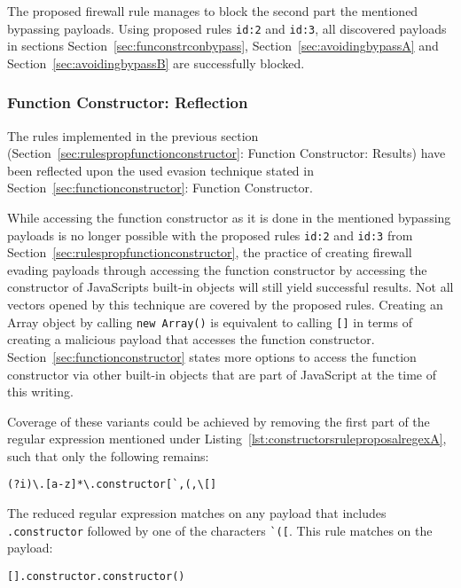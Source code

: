 The proposed firewall rule manages to block the second part the mentioned bypassing payloads. Using proposed rules \verb|id:2| and \verb|id:3|, all discovered payloads in sections Section~\ref{sec:funconstrconbypass}, Section~\ref{sec:avoidingbypassA} and Section~\ref{sec:avoidingbypassB} are successfully blocked.



\subsubsection{Function Constructor: Reflection}
\label{sec:rulespropfunctionconstructorreflection}
The rules implemented in the previous section (Section~\ref{sec:rulespropfunctionconstructor}: Function Constructor: Results) have been reflected upon the used evasion technique stated in Section~\ref{sec:functionconstructor}: Function Constructor.

While accessing the function constructor as it is done in the mentioned bypassing payloads is no longer possible with the proposed rules \verb|id:2| and \verb|id:3| from Section~\ref{sec:rulespropfunctionconstructor}, the practice of creating firewall evading payloads through accessing the function constructor by accessing the constructor of JavaScripts built-in objects will still yield successful results. Not all vectors opened by this technique are covered by the proposed rules. Creating an Array object by calling \verb|new Array()| is equivalent to calling \verb|[]| in terms of creating a malicious payload that accesses the function constructor. Section~\ref{sec:functionconstructor} states more options to access the function constructor via other built-in objects that are part of JavaScript at the time of this writing.

Coverage of these variants could be achieved by removing the first part of the regular expression mentioned under Listing~\ref{lst:constructorsruleproposalregexA}, such that only the following remains:

\begin{lstlisting}[style=basicStyle, caption=reduced regex of proposed rule id:2, label={lst:constructorsruleproposalregexB}]
(?i)\.[a-z]*\.constructor[`,(,\[]
\end{lstlisting}

The reduced regular expression matches on any payload that includes \verb|.constructor| followed by one of the characters \verb|`([|. This rule matches on the payload:

\begin{lstlisting}[style=basicStyle]
[].constructor.constructor()
\end{lstlisting}


